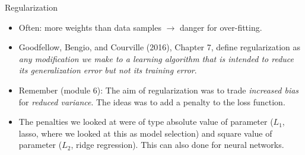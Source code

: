 \documentclass[
  10pt,
  ignorenonframetext,
]{beamer}
\providecommand{\tightlist}{%
  \setlength{\itemsep}{0pt}\setlength{\parskip}{0pt}}
\begin{document}
\begin{frame}
\begin{block}{Regularization}
\protect\hypertarget{regularization}{}
\(~\)

\begin{itemize}
\tightlist
\item
  Often: more weights than data samples \(\rightarrow\) danger for
  over-fitting.
\end{itemize}

\vspace{2mm}

\begin{itemize}
\tightlist
\item
  Goodfellow, Bengio, and Courville (2016), Chapter 7, define
  regularization as \emph{any modification we make to a learning
  algorithm that is intended to reduce its generalization error but not
  its training error}.
\end{itemize}

\vspace{2mm}

\begin{itemize}
\tightlist
\item
  Remember (module 6): The aim of regularization was to trade
  \emph{increased bias} for \emph{reduced variance}. The ideas was to
  add a penalty to the loss function.
\end{itemize}

\vspace{2mm}

\begin{itemize}
\tightlist
\item
  The penalties we looked at were of type absolute value of parameter
  (\(L_1\), lasso, where we looked at this as model selection) and
  square value of parameter (\(L_2\), ridge regression). This can also
  done for neural networks.
\end{itemize}
\end{block}
\end{frame}
\end{document}
